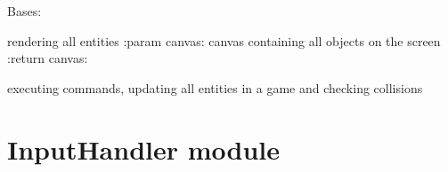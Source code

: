 \documentclass[letterpaper,10pt,english]{sphinxmanual}
\begin{document}
\begin{fulllineitems}
\label{\detokenize{GameEngine:GameEngine.GameEngine}}
\pysigstartsignatures
{}
\pysigstopsignatures
\sphinxAtStartPar
Bases: 

\begin{fulllineitems}
\label{\detokenize{GameEngine:GameEngine.GameEngine.render}}
\pysigstartsignatures
{}
\pysigstopsignatures
\sphinxAtStartPar
rendering all entities
:param canvas: canvas containing all objects on the screen
:return canvas:

\end{fulllineitems}


\begin{fulllineitems}
\label{\detokenize{GameEngine:GameEngine.GameEngine.update}}
\pysigstartsignatures
{}
\pysigstopsignatures
\sphinxAtStartPar
executing commands, updating all entities in a game and checking collisions

\end{fulllineitems}


\end{fulllineitems}


\sphinxstepscope


\section{InputHandler module}
\label{\detokenize{InputHandler:module-InputHandler}}\label{\detokenize{InputHandler:inputhandler-module}}\label{\detokenize{InputHandler::doc}}
\end{document}
